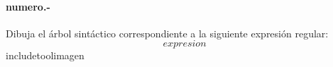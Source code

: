 
\paragraph{{numero}.-}\label{p{numero}}
Dibuja el árbol sintáctico correspondiente a la siguiente expresión regular:
\[
    {expresion}
\]
{includetool}{{imagen}}

